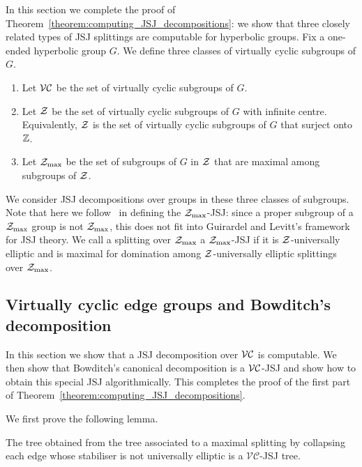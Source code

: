 In this section we complete the proof of Theorem~\ref{theorem:computing_JSJ_decompositions}: we show that three closely related types of JSJ splittings are computable for hyperbolic groups. 
Fix a one-ended hyperbolic group $G$.
We define three classes of virtually cyclic subgroups of $G$.
\begin{enumerate}
    \item Let $\mathcal{VC}$ be the set of virtually cyclic subgroups of $G$.
    \item Let $\mathcal{Z}$ be the set of virtually cyclic subgroups of $G$ with infinite centre.
        Equivalently, $\mathcal{Z}$ is the set of virtually cyclic subgroups of $G$ that surject onto $\mathbb{Z}$.
    \item Let $\mathcal{Z}_{\mathrm{max}}$ be the set of subgroups of $G$ in $\mathcal{Z}$ that are maximal among subgroups of $\mathcal{Z}$.
\end{enumerate}  
We consider JSJ decompositions over groups in these three classes of subgroups.
Note that here we follow~\cite{dahmaniguirardel11} in defining the $\mathcal{Z}_{\mathrm{max}}$-JSJ: since a proper subgroup of a $\mathcal{Z}_{\mathrm{max}}$ group is not $\mathcal{Z}_{\mathrm{max}}$, this does not fit into Guirardel and Levitt's framework for JSJ theory. 
We call a splitting over $\mathcal{Z}_{\mathrm{max}}$ a $\mathcal{Z}_{\mathrm{max}}$-JSJ if it is $\mathcal{Z}$-universally elliptic and is maximal for domination among $\mathcal{Z}$-universally elliptic splittings over $\mathcal{Z}_{\mathrm{max}}$.

\subsection{Virtually cyclic edge groups and Bowditch's decomposition}\label{section:VC-JSJ_computable}

In this section we show that a JSJ decomposition over $\mathcal{VC}$ is computable.
We then show that Bowditch's canonical decomposition is a $\mathcal{VC}$-JSJ and show how to obtain this special JSJ algorithmically.
This completes the proof of the first part of Theorem~\ref{theorem:computing_JSJ_decompositions}.

We first prove the following lemma.

\begin{lemma}\label{lemma:JSJ_from_maximal} The tree obtained from the tree
associated to a maximal splitting by collapsing each edge whose stabiliser is
not universally elliptic is a $\mathcal{VC}$-JSJ tree.\end{lemma}

